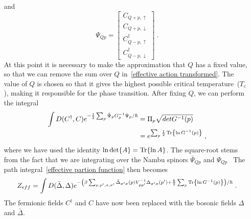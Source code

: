 \documentclass{article}
\begin{document}
and
\begin{equation}
   \Psi_{Q p} = 
\begin{bmatrix}
     C_{Q + p,\uparrow} \\
     C_{Q + p,\downarrow}  \\
     C^{\dagger}_{Q - p,\uparrow}  \\
     C^{\dagger}_{Q - p,\downarrow}
\end{bmatrix}\;.
\end{equation} 
At this point it is necessary to make the approximation that $Q$ has a fixed value, so that we can remove the sum over $Q$ in~\cref{effective action transformed}. The value of $Q$ is chosen so that it gives the highest possible critical temperature~($T_c$), making it responsible for the phase transition. After fixing $Q$, we can perform the integral  
\begin{align}
    \int D(C^{\dagger},C) e^{-\frac{1}{2} \sum_{p} \bar{\Psi}_{p} G^{-1}_ {p} \Psi_{p} / \hbar} &= \Pi_p \sqrt{det{G^{-1}(p)}} \nonumber\\
                                                                                               &= e^{\sum_p \frac{1}{2}\Tr{\ln{G^{-1}(p)}}} \;\nonumber,
\end{align}
where we have used the identity $\ln{\det{A}} = \Tr{\ln{A}}$. The square-root stems from the fact that we are integrating over the Nambu spinors $\bar{\Psi}_{Q p}$ and $\Psi_{Q p}$~\cite{Wegner2016,Hugdal2019}  The path integral~\cref{effective partion function} then becomes
\begin{equation}
    Z_{eff} = \int D(\bar{\Delta}, \Delta) e^{-\left(\beta\sum_{p,p',\sigma,\sigma'} \bar{\Delta}_{\sigma' \sigma}(p) V^{-1}_{p p'} \Delta_{\sigma' \sigma}(p') + \frac{\hbar}{2} \sum_p \Tr{\ln{G^{-1}(p)}}\right) / \hbar}\;. 
\end{equation}
The fermionic fields $C^{\dagger}$ and $C$ have now been replaced with the bosonic fields $\Delta$ and $\bar{\Delta}$.
\end{document}
